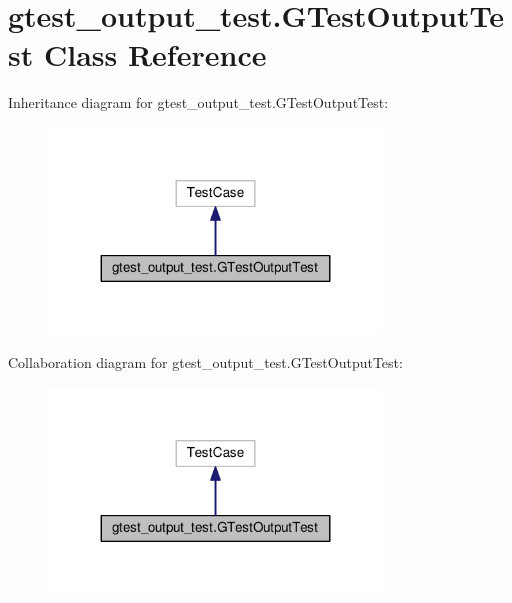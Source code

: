 \hypertarget{classgtest__output__test_1_1GTestOutputTest}{}\section{gtest\+\_\+output\+\_\+test.\+G\+Test\+Output\+Test Class Reference}
\label{classgtest__output__test_1_1GTestOutputTest}


Inheritance diagram for gtest\+\_\+output\+\_\+test.\+G\+Test\+Output\+Test\+:\nopagebreak
\begin{figure}[H]
\begin{center}
\leavevmode
\includegraphics[width=251pt]{classgtest__output__test_1_1GTestOutputTest__inherit__graph}
\end{center}
\end{figure}


Collaboration diagram for gtest\+\_\+output\+\_\+test.\+G\+Test\+Output\+Test\+:\nopagebreak
\begin{figure}[H]
\begin{center}
\leavevmode
\includegraphics[width=251pt]{classgtest__output__test_1_1GTestOutputTest__coll__graph}
\end{center}
\end{figure}

